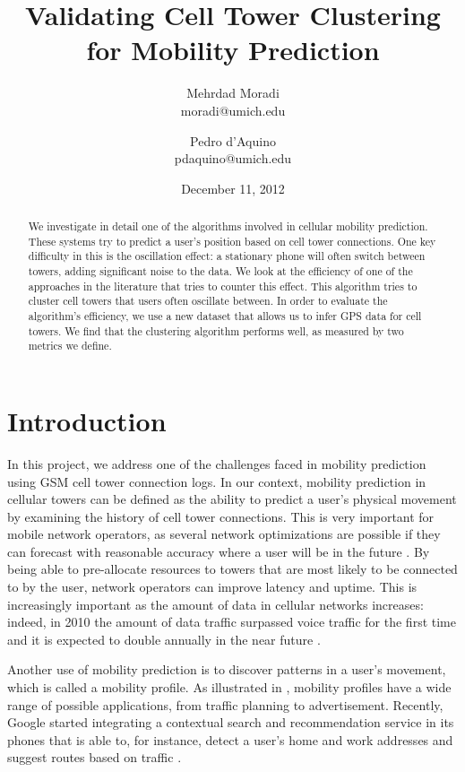 \documentclass[letterpaper, 12pt, conference]{ieeeconf}
\begin{document}
\title{\LARGE \bf
Validating Cell Tower Clustering for Mobility Prediction
}
\author{Mehrdad Moradi\\moradi@umich.edu \and Pedro d'Aquino\\
pdaquino@umich.edu}
\date{December 11, 2012}

\maketitle

\begin{abstract}
We investigate in detail one of the algorithms involved in cellular mobility 
prediction. These systems try to predict a user's position based on cell 
tower connections. One key difficulty in this is the oscillation effect: a 
stationary phone will often switch between towers, adding significant noise 
to the data. We look at the efficiency of one of the approaches in the 
literature that tries to counter this effect.  This algorithm tries to 
cluster cell towers that users often oscillate between. In order to 
evaluate the algorithm's efficiency, we use a new dataset that allows us to 
infer GPS data for cell towers. We find that the clustering algorithm performs well,
as measured by two metrics we define.
\end{abstract}

\section{Introduction}
\label{sec:intro}

In this project, we address one of the challenges faced in mobility 
prediction using GSM cell tower connection logs. In our context, mobility 
prediction in cellular
towers can be defined as the ability to predict a user's physical movement by 
examining the history of cell tower connections. This is very important
for mobile network operators, as several network optimizations are possible 
if they can forecast with reasonable accuracy
where a user will be in the future \cite{LeapGraph}\cite{Liu97anoptimal}. By 
being able to pre-allocate resources to towers that are most likely to
be connected to by the user, network operators can improve latency and 
uptime. This is increasingly important as the amount of data in cellular 
networks
increases: indeed, in 2010 the amount of data traffic surpassed voice traffic 
for the first time and it is expected to double annually in the near future
\cite{EricssonData}.

Another use of mobility prediction is to discover patterns in a user's movement, which is called a mobility profile\cite{mobilityprofiler}.
As illustrated in \cite
{mobilityprofiler}, mobility profiles have a wide range of possible 
applications, from traffic planning to advertisement. Recently, Google 
started integrating
a contextual search and recommendation service in its phones that is able to, 
for instance, detect a user's home and work addresses and suggest routes 
based on
traffic \cite{googleNow}.
\end{document}
